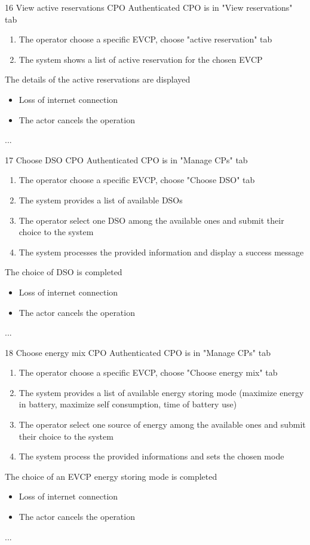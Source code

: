 \usecase
{16}
{View active reservations} %
{CPO} %
{Authenticated CPO is in "View reservations" tab} %
{ %
    \begin{enumerate}
        \item The operator choose a specific EVCP, choose "active reservation" tab
        \item The system shows a list of active reservation for the chosen EVCP
    \end{enumerate}
}
{The details of the active reservations are displayed} %
{ %
    \begin{itemize}
        \item Loss of internet connection
        \item The actor cancels the operation
    \end{itemize}
}
{ %
    ...
}

\usecase
{17}
{Choose DSO} %
{CPO} %
{Authenticated CPO is in "Manage CPs" tab} %
{ %
    \begin{enumerate}
        \item The operator choose a specific EVCP, choose "Choose DSO" tab
        \item The system provides a list of available DSOs
        \item The operator select one DSO among the available ones and submit their choice to the system
        \item The system processes the provided information and display a success message
    \end{enumerate}
}
{The choice of DSO is completed} %
{ %
    \begin{itemize}
        \item Loss of internet connection
        \item The actor cancels the operation
    \end{itemize}
}
{ %
    ...
}

\usecase
{18}
{Choose energy mix} %
{CPO} %
{Authenticated CPO is in "Manage CPs" tab} %
{ %
    \begin{enumerate}
        \item The operator choose a specific EVCP, choose "Choose energy mix" tab
        \item The system provides a list of available energy storing mode (maximize energy in battery, maximize self consumption, time of battery use)
        \item The operator select one source of energy among the available ones and submit their choice to the system
        \item The system process the provided informations and sets the chosen mode
    \end{enumerate}
}
{The choice of an EVCP energy storing mode is completed} %
{ %
    \begin{itemize}
        \item Loss of internet connection
        \item The actor cancels the operation
    \end{itemize}
}
{ %
    ...
}

